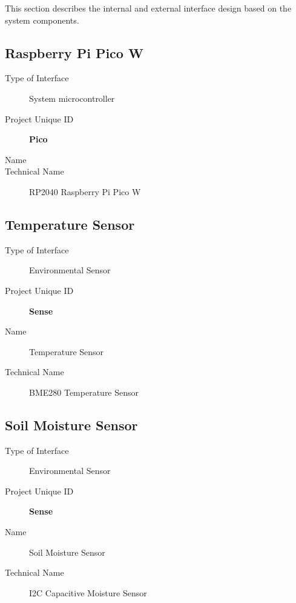 This section describes the internal and external interface design based on the system components.


\subsection{Raspberry Pi Pico W}
\label{loc:InterfaceOne}
% 

\begin{description}
    \item[Type of Interface] System microcontroller
    \item[Project Unique ID] \textbf{Pico}
    \item[Name] \RaspPi
    \item[Technical Name] RP2040 Raspberry Pi Pico W
\end{description}

\subsection{Temperature Sensor}
\label{loc:InterfaceTwo}
%

\begin{description}
    \item[Type of Interface] Environmental Sensor
    \item[Project Unique ID] \textbf{Sense}
    \item[Name] Temperature Sensor
    \item[Technical Name] BME280 Temperature Sensor
\end{description}

\subsection{Soil Moisture Sensor}
\label{loc:InterfaceThree}
%

\begin{description}
    \item[Type of Interface] Environmental Sensor
    \item[Project Unique ID] \textbf{Sense}
    \item[Name] Soil Moisture Sensor
    \item[Technical Name] I2C Capacitive Moisture Sensor
\end{description}

